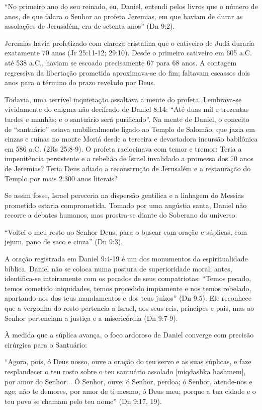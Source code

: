 \documentclass[11pt,a4paper,openany]{book}
\begin{document}
``No primeiro ano do seu reinado, eu, Daniel, entendi pelos livros que o número de anos, de que falara o Senhor ao profeta Jeremias, em que haviam de durar as assolações de Jerusalém, era de setenta anos'' (Dn 9:2).

Jeremias havia profetizado com clareza cristalina que o cativeiro de Judá duraria exatamente 70 anos (Jr 25:11-12; 29:10). Desde o primeiro cativeiro em 605 a.C. até 538 a.C., haviam se escoado precisamente 67 para 68 anos. A contagem regressiva da libertação prometida aproximava-se do fim; faltavam escassos dois anos para o término do prazo revelado por Deus.

Todavia, uma terrível inquietação assaltava a mente do profeta. Lembrava-se vividamente do enigma não decifrado de Daniel 8:14: ``Até duas mil e trezentas tardes e manhãs; e o santuário será purificado''. Na mente de Daniel, o conceito de ``santuário'' estava umbilicalmente ligado ao Templo de Salomão, que jazia em cinzas e ruínas no monte Moriá desde a terceira e devastadora incursão babilônica em 586 a.C. (2Rs 25:8-9). O profeta raciocinava com temor e tremor: Teria a impenitência persistente e a rebelião de Israel invalidado a promessa dos 70 anos de Jeremias? Teria Deus adiado a reconstrução de Jerusalém e a restauração do Templo por mais 2.300 anos literais?

Se assim fosse, Israel pereceria na dispersão gentílica e a linhagem do Messias prometido estaria comprometida. Tomado por uma angústia santa, Daniel não recorre a debates humanos, mas prostra-se diante do Soberano do universo:

``Voltei o meu rosto ao Senhor Deus, para o buscar com oração e súplicas, com jejum, pano de saco e cinza'' (Dn 9:3).

A oração registrada em Daniel 9:4-19 é um dos monumentos da espiritualidade bíblica. Daniel não se coloca numa postura de superioridade moral; antes, identifica-se inteiramente com os pecados de seus compatriotas: ``Temos pecado, temos cometido iniquidades, temos procedido impiamente e nos temos rebelado, apartando-nos dos teus mandamentos e dos teus juízos'' (Dn 9:5). Ele reconhece que a vergonha do rosto pertencia a Israel, aos seus reis, príncipes e pais, mas ao Senhor pertenciam a justiça e a misericórdia (Dn 9:7-9).

À medida que a súplica avança, o foco ardoroso de Daniel converge com precisão cirúrgica para o Santuário:

``Agora, pois, ó Deus nosso, ouve a oração do teu servo e as suas súplicas, e faze resplandecer o teu rosto sobre o teu santuário assolado [miqdashka hashmem], por amor do Senhor... Ó Senhor, ouve; ó Senhor, perdoa; ó Senhor, atende-nos e age; não te demores, por amor de ti mesmo, ó Deus meu; porque a tua cidade e o teu povo se chamam pelo teu nome'' (Dn 9:17, 19).
\end{document}
